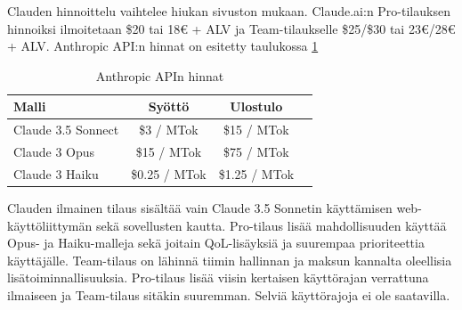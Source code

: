 Clauden hinnoittelu vaihtelee hiukan sivuston mukaan. Claude.ai:n Pro-tilauksen
hinnoiksi ilmoitetaan \$20 tai 18€ + ALV ja Team-tilaukselle \$25/\$30 tai
23€/28€ + ALV. \parencite{anthropicPricing} \parencite{claudePricing} Anthropic
API:n hinnat on esitetty taulukossa \ref{tab:anthropic-api-pricing}

\begin{table}[H]
  \centering
  \caption{Anthropic APIn hinnat}
  \label{tab:anthropic-api-pricing}
  \begin{tabular}{lccc}
    \textbf{Malli} & \textbf{Syöttö} & \textbf{Ulostulo} \\
    \hline
    Claude 3.5 Sonnect &    \$3 / MTok &   \$15 / MTok \\
    Claude 3 Opus      &   \$15 / MTok &   \$75 / MTok \\
    Claude 3 Haiku     & \$0.25 / MTok & \$1.25 / MTok \\
    \hline
  \end{tabular}
\end{table}

Clauden ilmainen tilaus sisältää vain Claude 3.5 Sonnetin käyttämisen web-
käyttöliittymän sekä sovellusten kautta. Pro-tilaus lisää mahdollisuuden
käyttää Opus- ja Haiku-malleja sekä joitain QoL-lisäyksiä ja suurempaa
prioriteettia käyttäjälle. Team-tilaus on lähinnä tiimin hallinnan ja maksun
kannalta oleellisia lisätoiminnallisuuksia. Pro-tilaus lisää viisin kertaisen
käyttörajan verrattuna ilmaiseen ja Team-tilaus sitäkin suuremman.
\parencite{anthropicPricing} \parencite{claudePricing} Selviä käyttörajoja ei
ole saatavilla.
